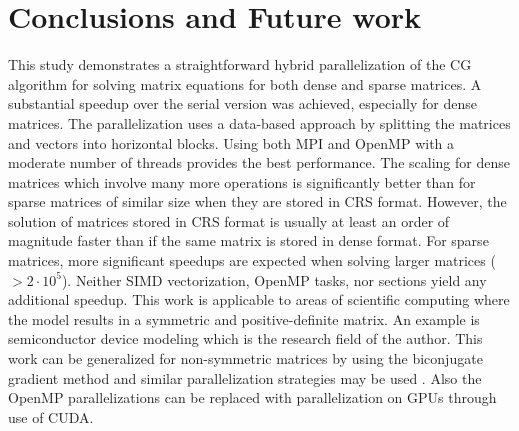 \documentclass{article}
\begin{document}
\section{Conclusions and Future work}
This study demonstrates a straightforward hybrid parallelization of the CG algorithm for solving matrix equations for both dense and sparse matrices. A substantial speedup over the serial version was achieved, especially for dense matrices. The parallelization uses a data-based approach by splitting the matrices and vectors into horizontal blocks. Using both MPI and OpenMP with a moderate number of threads provides the best performance. The scaling for dense matrices which involve many more operations is significantly better than for sparse matrices of similar size when they are stored in CRS format. However, the solution of matrices stored in CRS format is usually at least an order of magnitude faster than if the same matrix is stored in dense format. For sparse matrices, more significant speedups are expected when solving larger matrices ($>2 \cdot 10^{5}$). Neither SIMD vectorization, OpenMP tasks, nor sections yield any additional speedup. This work is applicable to areas of scientific computing where the model results in a symmetric and positive-definite matrix. An example is semiconductor device modeling which is the research field of the author. This work can be generalized for non-symmetric matrices by using the biconjugate gradient method and similar parallelization strategies may be used \cite{Ning}. Also the OpenMP parallelizations can be replaced with parallelization on GPUs through use of CUDA.
\end{document}
